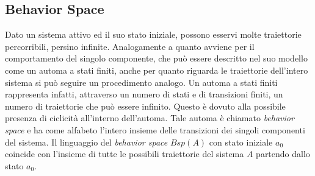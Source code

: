 \subsection{Behavior Space}
Dato un sistema attivo ed il suo stato iniziale, possono esservi molte traiettorie percorribili, persino infinite. Analogamente a quanto avviene per il comportamento del singolo componente, che può essere descritto nel suo modello come un automa a stati finiti, anche per quanto riguarda le traiettorie dell'intero sistema si può seguire un procedimento analogo. Un automa a stati finiti rappresenta infatti, attraverso un numero di stati e di transizioni finiti, un numero di traiettorie che può essere infinito. Questo è dovuto alla possibile presenza di ciclicità all'interno dell'automa. Tale automa è chiamato \emph{behavior space} e ha come alfabeto l'intero insieme delle transizioni dei singoli componenti del sistema.
Il linguaggio del \emph{behavior space} $Bsp(A)$ con stato iniziale $a_0$ coincide con l'insieme di tutte le possibili traiettorie del sistema $A$ partendo dallo stato $a_0$. 
